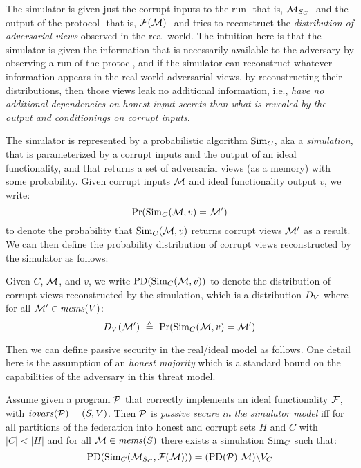 The simulator is given just the corrupt inputs to the run- that is,
$\mathcal{M}_{S_C}$- and the output of the protocol- that is,
$\mathcal{F}(\mathcal{M})$- and tries to reconstruct the \emph{distribution of
adversarial views} observed in the real world. The intuition here is
that the simulator is given the information that is necessarily
available to the adversary by observing a run of the protocl, and if
the simulator can reconstruct whatever information appears in the real
world adversarial views, by reconstructing their distributions, then
those views leak no additional information, i.e., \emph{have no
additional dependencies on honest input secrets than what is revealed
by the output and conditionings on corrupt inputs}.

The simulator is represented by a probabilistic algorithm $\mathrm{Sim}_C$,
aka a \emph{simulation}, that is parameterized by a corrupt inputs and
the output of an ideal functionality, and that returns a set of
adversarial views (as a memory) with some probability. Given
corrupt inputs $\mathcal{M}$ and ideal functionality output $v$,  
we write:
$$
\mathrm{Pr}(\mathrm{Sim}_C(\mathcal{M},v) = \mathcal{M}')
$$
to denote the probability that $\mathrm{Sim}_C(\mathcal{M},v)$
returns corrupt views $\mathcal{M}'$ as a result. We can then define the
probability distribution of corrupt views reconstructed
by the simulator as follows:
\begin{definition}
  Given $C$, $\mathcal{M}$, and $v$, we write $\mathrm{PD}(\mathrm{Sim}_C(\mathcal{M},v))$ to
  denote the distribution of corrupt views reconstructed by the
  simulation, which is a distribution $D_{V}$ where for
  all $\mathcal{M}' \in \mathit{mems}(V)$:
  $$
  D_{V}(\mathcal{M}')\ \triangleq\ \mathrm{Pr}(\mathrm{Sim}_C(\mathcal{M},v) = \mathcal{M}') 
  $$
\end{definition}

Then we can define passive security in the real/ideal
model as follows. One detail here is the assumption of an
\emph{honest majority} which is a standard bound on the
capabilities of the adversary in this threat model.
\begin{definition}
  Assume given a program $\mathcal{P}$ that correctly implements an ideal
  functionality $\mathcal{F}$, with $\mathit{iovars}(\mathcal{P}) = (S,V)$.  Then $\mathcal{P}$
  is \emph{passive secure in the simulator model} iff for all
  partitions of the federation into honest and corrupt sets $H$ and $C$
  with $|C| < |H|$ and for all $\mathcal{M} \in \mathit{mems}(S)$ there exists a
  simulation $\mathrm{Sim}_C$ such that:
  $$
  \mathrm{PD}(\mathrm{Sim}_C(\mathcal{M}_{S_C},\mathcal{F}(\mathcal{M}))) = (\mathrm{PD}(\mathcal{P})|\mathcal{M})\backslash V_C
  $$
\end{definition}


